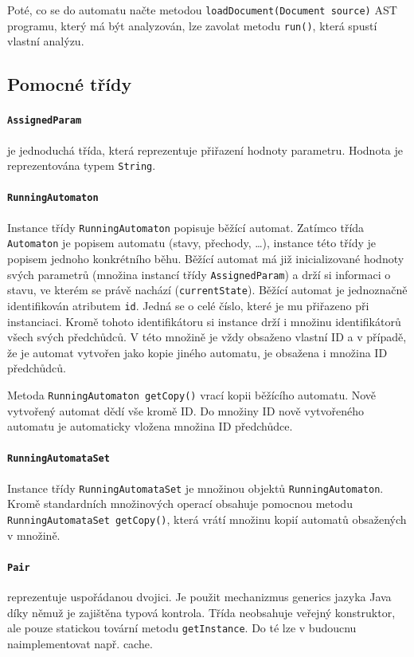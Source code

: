 \documentclass[11pt,final,oneside]{fithesis}
\begin{document}
Poté, co se do automatu načte metodou {\tt loadDocument(Document source)} AST programu, který má být analyzován, lze zavolat metodu {\tt run()}, která spustí vlastní analýzu.

\subsection{Pomocné třídy}

\paragraph{\texttt{AssignedParam}}
je jednoduchá třída, která reprezentuje přiřazení hodnoty parametru. Hodnota je reprezentována typem \texttt{String}.

\paragraph{\texttt{RunningAutomaton}}
Instance třídy {\tt RunningAutomaton} popisuje běžící automat. Zatímco třída \texttt{Automaton} je popisem automatu (stavy, přechody, \ldots), instance této třídy je popisem jednoho konkrétního běhu. Běžící automat má již inicializované hodnoty svých parametrů (množina instancí třídy \texttt{AssignedParam}) a drží si informaci o stavu, ve kterém se právě nachází (\texttt{currentState}). Běžící automat je jednoznačně identifikován atributem \texttt{id}. Jedná se o celé číslo, které je mu přiřazeno při instanciaci. Kromě tohoto identifikátoru si instance drží i množinu identifikátorů všech svých předchůdců. V této množině je vždy obsaženo vlastní ID a v případě, že je automat vytvořen jako kopie jiného automatu, je obsažena i množina ID předchůdců.

Metoda \texttt{RunningAutomaton getCopy()} vrací kopii běžícího automatu. Nově vytvořený automat dědí vše kromě ID. Do množiny ID nově vytvořeného automatu je automaticky vložena množina ID předchůdce.

\paragraph{\texttt{RunningAutomataSet}}
Instance třídy \texttt{RunningAutomataSet} je množinou objektů \texttt{RunningAutomaton}. Kromě standardních množinových operací obsahuje pomocnou metodu \texttt{RunningAutomataSet getCopy()}\label{set-get-copy}, která vrátí množinu kopií automatů obsažených v množině.

\paragraph{\texttt{Pair}}
reprezentuje uspořádanou dvojici. Je použit mechanizmus generics jazyka Java díky němuž je zajištěna typová kontrola. Třída neobsahuje veřejný konstruktor, ale pouze statickou tovární metodu \texttt{getInstance}. Do té lze v budoucnu naimplementovat např. cache.
\end{document}
